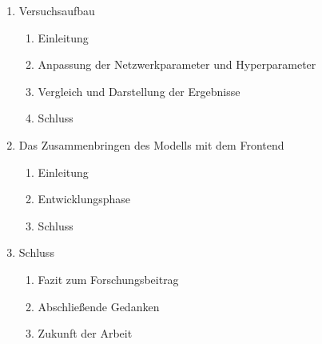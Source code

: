 \begin{enumerate}
  \item Versuchsaufbau
  \begin{enumerate}
    \item Einleitung
    \item Anpassung der Netzwerkparameter und Hyperparameter
    \item Vergleich und Darstellung der Ergebnisse
    \item Schluss
  \end{enumerate}

  \item Das Zusammenbringen des Modells mit dem Frontend
  \begin{enumerate}
    \item Einleitung
    \item Entwicklungsphase
    \item Schluss
  \end{enumerate}

  \item Schluss
  \begin{enumerate}
    \item Fazit zum Forschungsbeitrag
    \item Abschließende Gedanken
    \item Zukunft der Arbeit
  \end{enumerate}
\end{enumerate}








